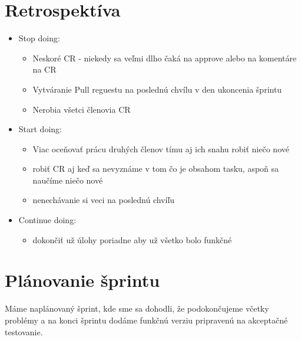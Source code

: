 \documentclass{article}
\begin{document}
    \section*{Retrospektíva}

        \begin{itemize}
            \item {Stop doing:}
                \begin{itemize}
                    \item {Neskoré CR - niekedy sa veľmi dlho čaká na approve alebo na komentáre na CR}
                    \item {Vytváranie Pull reguestu na poslednú chvílu v den ukoncenia šprintu}
                    \item {Nerobia všetci členovia CR}
                \end{itemize}
            \item {Start doing:}
                \begin{itemize}
                    \item {Viac oceňovať prácu druhých členov tímu aj ich snahu robiť niečo nové}
                    \item {robiť CR aj keď sa nevyznáme v tom čo je obsahom tasku, aspoň sa naučíme niečo nové}
                    \item {nenechávanie si veci na poslednú chvíľu}
                \end{itemize}
            \item {Continue doing:}
                \begin{itemize}
                    \item {dokončiť už úlohy poriadne aby už všetko bolo funkčné}
                \end{itemize}
        \end{itemize}

    \section*{Plánovanie šprintu}
        \textnormal {Máme naplánovaný šprint, kde sme sa dohodli, že podokončujeme včetky problémy a na konci šprintu dodáme funkčnú verziu pripravenú na akceptačné testovanie.}
\end{document}
